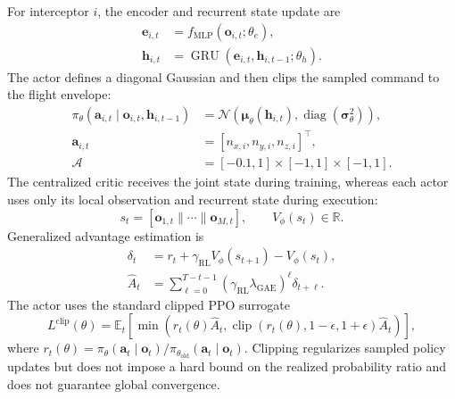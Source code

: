 \documentclass[lettersize,journal]{IEEEtran}
\begin{document}
For interceptor \(i\), the encoder and recurrent state update are
\begin{align}
\mathbf{e}_{i,t}&=f_{\mathrm{MLP}}(\mathbf{o}_{i,t};\theta_e),\\
\mathbf{h}_{i,t}&=\operatorname{GRU}(\mathbf{e}_{i,t},
\mathbf{h}_{i,t-1};\theta_h).
\label{eq:rmapppo_gru}
\end{align}
The actor defines a diagonal Gaussian and then clips the sampled command to the
flight envelope:
\begin{align}
\pi_\theta(\mathbf{a}_{i,t}\mid\mathbf{o}_{i,t},\mathbf{h}_{i,t-1})
 &=\mathcal{N}\!\left(\boldsymbol{\mu}_\theta(\mathbf{h}_{i,t}),
 \operatorname{diag}(\boldsymbol{\sigma}_\theta^2)\right),\nonumber\\[-2pt]
\mathbf{a}_{i,t}&=[n_{x,i},n_{y,i},n_{z,i}]^\top,\nonumber\\
\mathcal A&=[-0.1,1]\times[-1,1]\times[-1,1].
\label{eq:action3d}
\end{align}
The centralized critic receives the joint state during training, whereas each
actor uses only its local observation and recurrent state during execution:
\begin{equation}
s_t=[\mathbf{o}_{1,t}\|\cdots\|\mathbf{o}_{M,t}],\qquad
V_\phi(s_t)\in\mathbb{R}.
\end{equation}
Generalized advantage estimation is
\begin{align}
\delta_t&=r_t+\gamma_{\mathrm{RL}}V_\phi(s_{t+1})-V_\phi(s_t),\\
\hat A_t&=\sum_{\ell=0}^{T-t-1}
(\gamma_{\mathrm{RL}}\lambda_{\mathrm{GAE}})^\ell\delta_{t+\ell}.
\end{align}
The actor uses the standard clipped PPO surrogate
\begin{equation}
L^{\mathrm{clip}}(\theta)=
\mathbb{E}_t\!\left[
\min\!\left(r_t(\theta)\hat A_t,
\operatorname{clip}(r_t(\theta),1-\epsilon,1+\epsilon)\hat A_t\right)
\right],
\end{equation}
where \(r_t(\theta)=\pi_\theta(\mathbf a_t\mid\mathbf o_t)/
\pi_{\theta_{\mathrm{old}}}(\mathbf a_t\mid\mathbf o_t)\).
Clipping regularizes sampled policy updates but does not impose a hard bound on
the realized probability ratio and does not guarantee global convergence.
\end{document}
